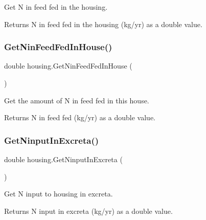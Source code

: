 Get N in feed fed in the housing. 

\begin{DoxyReturn}{Returns}
N in feed fed in the housing (kg/yr) as a double value. 
\end{DoxyReturn}
\mbox{\label{classhousing_af8d0876ee58aa70abc1177d6696a702f}} 
\subsubsection{\texorpdfstring{GetNinFeedFedInHouse()}{GetNinFeedFedInHouse()}}
{\footnotesize\ttfamily double housing.\+Get\+Nin\+Feed\+Fed\+In\+House (\begin{DoxyParamCaption}{ }\end{DoxyParamCaption})\hspace{0.3cm}{\ttfamily [inline]}}



Get the amount of N in feed fed in this house. 

\begin{DoxyReturn}{Returns}
N in feed fed (kg/yr) as a double value. 
\end{DoxyReturn}
\mbox{\label{classhousing_a0a1d8600d48a183b940e1bdc856a0efa}} 
\subsubsection{\texorpdfstring{GetNinputInExcreta()}{GetNinputInExcreta()}}
{\footnotesize\ttfamily double housing.\+Get\+Ninput\+In\+Excreta (\begin{DoxyParamCaption}{ }\end{DoxyParamCaption})\hspace{0.3cm}{\ttfamily [inline]}}



Get N input to housing in excreta. 

\begin{DoxyReturn}{Returns}
N input in excreta (kg/yr) as a double value. 
\end{DoxyReturn}
\mbox{\label{classhousing_ad09b87a6a7e307b2aa674535ec60db44}} 
